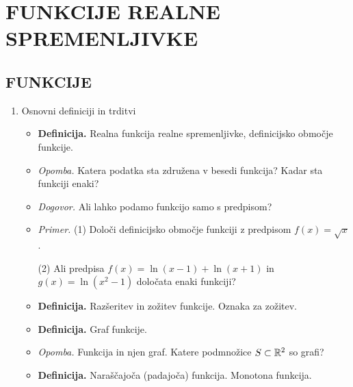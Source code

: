 \section{FUNKCIJE REALNE SPREMENLJIVKE}
\subsection{FUNKCIJE}

\begin{enumerate}
    \item Osnovni definiciji in trditvi
    \begin{itemize}
        \item \colorbox{purple!30}{\textbf{Definicija.}} Realna funkcija realne spremenljivke, definicijsko območje funkcije.
        \item \colorbox{yellow!30}{\emph{Opomba.}} Katera podatka sta združena v besedi funkcija? Kadar sta funkciji enaki?
        \item \colorbox{yellow!30}{\emph{Dogovor.}} Ali lahko podamo funkcijo samo s predpisom?
        \item \colorbox{yellow!30}{\emph{Primer.}} (1) Določi definicijsko območje funkciji z predpisom $f(x) = \sqrt{x}$.
        
        (2) Ali predpisa $f(x) = \ln (x-1) + \ln(x+1)$ in $g(x) = \ln (x^2 - 1)$ določata enaki funkciji?
        \item \colorbox{purple!30}{\textbf{Definicija.}} Razšeritev in zožitev funkcije. Oznaka za zožitev.
        \item \colorbox{purple!30}{\textbf{Definicija.}} Graf funkcije.
        \item \colorbox{yellow!30}{\emph{Opomba.}} Funkcija in njen graf. Katere podmnožice $S \subset \mathbb{R}^2$ so grafi?        
        \item \colorbox{purple!30}{\textbf{Definicija.}} Naraščajoča (padajoča) funkcija. Monotona funkcija.
    \end{itemize}


\end{enumerate}
